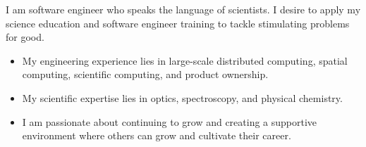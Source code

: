 

\begin{cvparagraph}
I am software engineer who speaks the language of scientists. I desire to apply
my science education and software engineer training to tackle stimulating problems
for good.
\begin{itemize}
    \item{ 
        My engineering experience lies in large-scale distributed 
        computing, spatial computing, scientific computing, and product ownership.
    }

    \item {
        My scientific expertise lies in optics, spectroscopy, and physical chemistry.
    }

    \item {
        I am passionate about continuing to grow and creating a supportive
        environment where others can grow and cultivate their career.
    }
\end{itemize}
\end{cvparagraph}
